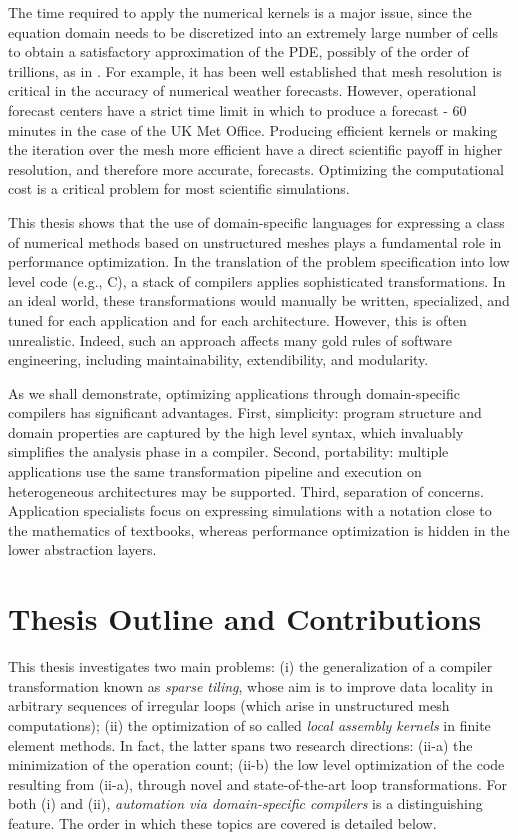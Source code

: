 The time required to apply the numerical kernels is a major issue, since the equation domain needs to be discretized into an extremely large number of cells to obtain a satisfactory approximation of the PDE, possibly of the order of trillions, as in \cite{Rossinelli2013}. For example, it has been well established that mesh resolution is critical in the accuracy of numerical weather forecasts. However, operational forecast centers have a strict time limit in which to produce a forecast - 60 minutes in the case of the UK Met Office. Producing efficient kernels or making the iteration over the mesh more efficient have a direct scientific payoff in higher resolution, and therefore more accurate, forecasts. Optimizing the computational cost is a critical problem for most scientific simulations.

This thesis shows that the use of domain-specific languages for expressing a class of numerical methods based on unstructured meshes plays a fundamental role in performance optimization. In the translation of the problem specification into low level code (e.g., C), a stack of compilers applies sophisticated transformations. In an ideal world, these transformations would manually be written, specialized, and tuned for each application and for each architecture. However, this is often unrealistic. Indeed, such an approach affects many gold rules of software engineering, including maintainability, extendibility, and modularity.

As we shall demonstrate, optimizing applications through domain-specific compilers has significant advantages. First, simplicity: program structure and domain properties are captured by the high level syntax, which invaluably simplifies the analysis phase in a compiler. Second, portability: multiple applications use the same transformation pipeline and execution on heterogeneous architectures may be supported. Third, separation of concerns. Application specialists focus on expressing simulations with a notation close to the mathematics of textbooks, whereas performance optimization is hidden in the lower abstraction layers. 

\section{Thesis Outline and Contributions}
\label{sec:contributions}
This thesis investigates two main problems: (i) the generalization of a compiler transformation known as {\em sparse tiling}, whose aim is to improve data locality in arbitrary sequences of irregular loops (which arise in unstructured mesh computations); (ii) the optimization of so called {\em local assembly kernels} in finite element methods. In fact, the latter spans two research directions: (ii-a) the minimization of the operation count; (ii-b) the low level optimization of the code resulting from (ii-a), through novel and state-of-the-art loop transformations. For both (i) and (ii), {\it automation via domain-specific compilers} is a distinguishing feature. The order in which these topics are covered is detailed below.

